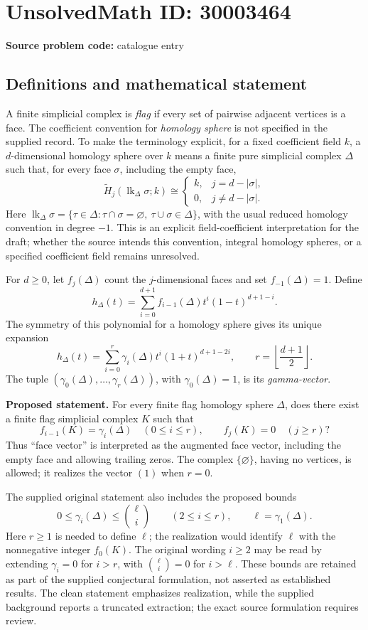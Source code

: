 \documentclass[11pt]{article}
\begin{document}
\section*{UnsolvedMath ID: 30003464}
\textbf{Source problem code:} catalogue entry
\subsection{Definitions and mathematical statement}
A finite simplicial complex is \emph{flag} if every set of pairwise adjacent vertices is a face. The coefficient convention for \emph{homology sphere} is not specified in the supplied record. To make the terminology explicit, for a fixed coefficient field \(k\), a \(d\)-dimensional homology sphere over \(k\) means a finite pure simplicial complex \(\Delta\) such that, for every face \(\sigma\), including the empty face,
\[
\widetilde H_j(\operatorname{lk}_{\Delta}\sigma;k)\cong
\begin{cases}
k,&j=d-|\sigma|,\\
0,&j\ne d-|\sigma|.
\end{cases}
\]
Here \(\operatorname{lk}_{\Delta}\sigma=\{\tau\in\Delta:\tau\cap\sigma=\varnothing,\ \tau\cup\sigma\in\Delta\}\), with the usual reduced homology convention in degree \(-1\). This is an explicit field-coefficient interpretation for the draft; whether the source intends this convention, integral homology spheres, or a specified coefficient field remains unresolved.

For \(d\geq0\), let \(f_j(\Delta)\) count the \(j\)-dimensional faces and set \(f_{-1}(\Delta)=1\). Define
\[
h_{\Delta}(t)=\sum_{i=0}^{d+1}f_{i-1}(\Delta)t^i(1-t)^{d+1-i}.
\]
The symmetry of this polynomial for a homology sphere gives its unique expansion
\[
h_{\Delta}(t)=\sum_{i=0}^{r}\gamma_i(\Delta)t^i(1+t)^{d+1-2i},
\qquad r=\left\lfloor\frac{d+1}{2}\right\rfloor.
\]
The tuple \((\gamma_0(\Delta),\ldots,\gamma_r(\Delta))\), with \(\gamma_0(\Delta)=1\), is its \emph{gamma-vector}.

\textbf{Proposed statement.} For every finite flag homology sphere \(\Delta\), does there exist a finite flag simplicial complex \(K\) such that
\[
f_{i-1}(K)=\gamma_i(\Delta)\quad(0\leq i\leq r),
\qquad f_j(K)=0\quad(j\geq r)?
\]
Thus ``face vector'' is interpreted as the augmented face vector, including the empty face and allowing trailing zeros. The complex \(\{\varnothing\}\), having no vertices, is allowed; it realizes the vector \((1)\) when \(r=0\).

The supplied original statement also includes the proposed bounds
\[
0\leq\gamma_i(\Delta)\leq\binom{\ell}{i}\qquad(2\leq i\leq r),
\qquad \ell=\gamma_1(\Delta).
\]
Here \(r\geq1\) is needed to define \(\ell\); the realization would identify \(\ell\) with the nonnegative integer \(f_0(K)\). The original wording \(i\geq2\) may be read by extending \(\gamma_i=0\) for \(i>r\), with \(\binom{\ell}{i}=0\) for \(i>\ell\). These bounds are retained as part of the supplied conjectural formulation, not asserted as established results. The clean statement emphasizes realization, while the supplied background reports a truncated extraction; the exact source formulation requires review.
\end{document}
